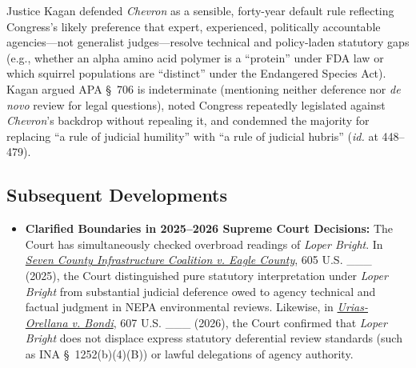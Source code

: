 \documentclass[12pt]{article}
\begin{document}
Justice Kagan defended \textit{Chevron} as a sensible, forty-year default rule reflecting Congress's likely preference that expert, experienced, politically accountable agencies---not generalist judges---resolve technical and policy-laden statutory gaps (e.g., whether an alpha amino acid polymer is a ``protein'' under FDA law or which squirrel populations are ``distinct'' under the Endangered Species Act). Kagan argued APA \S~706 is indeterminate (mentioning neither deference nor \textit{de novo} review for legal questions), noted Congress repeatedly legislated against \textit{Chevron}'s backdrop without repealing it, and condemned the majority for replacing ``a rule of judicial humility'' with ``a rule of judicial hubris'' (\textit{id.} at 448--479).

\subsection{Subsequent Developments}

\begin{itemize}

\item \textbf{Clarified Boundaries in 2025--2026 Supreme Court Decisions:} The Court has simultaneously checked overbroad readings of \textit{Loper Bright}. In \href{https://www.supremecourt.gov/opinions/24pdf/23-975_m648.pdf}{\textit{Seven County Infrastructure Coalition v. Eagle County}}, 605 U.S. \_\_\_ (2025), the Court distinguished pure statutory interpretation under \textit{Loper Bright} from substantial judicial deference owed to agency technical and factual judgment in NEPA environmental reviews. Likewise, in \href{https://supreme.justia.com/cases/federal/us/607/24-777/}{\textit{Urias-Orellana v. Bondi}}, 607 U.S. \_\_\_ (2026), the Court confirmed that \textit{Loper Bright} does not displace express statutory deferential review standards (such as INA \S~1252(b)(4)(B)) or lawful delegations of agency authority.

\end{itemize}
\end{document}
